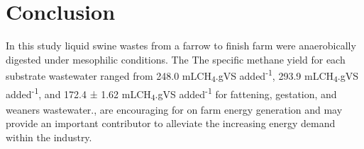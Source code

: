 \section{Conclusion}
In this study liquid swine wastes from a farrow to finish farm were anaerobically digested under mesophilic conditions. The The specific methane yield for each substrate wastewater ranged from 248.0 mLCH\textsubscript{4}.gVS added\textsuperscript{-1}, 293.9 mLCH\textsubscript{4}.gVS added\textsuperscript{-1}, and 172.4 ± 1.62 mLCH\textsubscript{4}.gVS added\textsuperscript{-1} for fattening, gestation, and weaners wastewater.,  are encouraging for on farm energy generation and may provide an important contributor to alleviate the increasing energy demand within the industry.